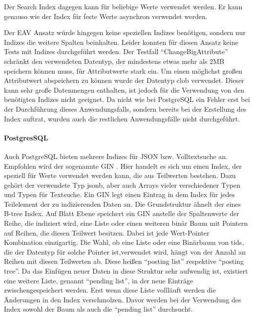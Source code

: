 Der Search Index dagegen kann für beliebige Werte verwendet werden. Er kann genauso wie der Index für feste Werte asynchron verwendet werden. \cite{OracleHelpCenter.2019}

Der EAV Ansatz würde hingegen keine speziellen Indizes benötigen, sondern nur Indizes die weitere Spalten beinhalten. Leider konnten für diesen Ansatz keine Tests mit Indizes durchgeführt werden. Der Testfall ``ChangeBigAttribute'' schränkt den verwendeten Datentyp, der mindestens etwas mehr als 2MB speichern können muss, für Attributwerte stark ein. Um einen möglichst großen Attributwert abspeichern zu können wurde der Datentyp clob verwendet. Dieser kann sehr große Datenmengen enthalten, ist jedoch für die Verwendung von den benötigten Indizes nicht geeignet. Da nicht wie bei PostgreSQL ein Fehler erst bei der Durchführung dieses Anwendungsfalls, sondern bereits bei der Erstellung des Index auftrat, wurden auch die restlichen Anwendungsfälle nicht durchgeführt.



\paragraph{PostgresSQL}

Auch PostgreSQL bieten mehrere Indizes für \ac{JSON} bzw. Volltextsuche an. Empfohlen wird der sogenannte \acf{GIN} \cite{PostgreSQLDocumentation.2021}. Hier handelt es sich um einen Index, der speziell für Werte verwendet werden kann, die aus Teilwerten bestehen. Dazu gehört der verwendete Typ jsonb, aber auch Arrays vieler verschiedener Typen und Typen für Textsuche. Ein \ac{GIN} legt einen Eintrag in dem Index für jedes Teilelement der zu indizierenden Daten an. Die Grundstruktur ähnelt der eines B-tree Index. Auf Blatt Ebene speichert ein \ac{GIN} anstelle der Spaltenwerte der Reihe, die indiziert wird, eine Liste oder einen weiteren binär Baum mit Pointern auf Reihen, die diesen Teilwert besitzen. Dabei ist jede Wert-Pointer Kombination einzigartig. Die Wahl, ob eine Liste oder eine Binärbaum von tids, die der Datentyp für solche Pointer ist,verwendet wird, hängt von der Anzahl an Reihen mit diesen Teilwerten ab. Diese heißen ``posting list'' respektive ``posting tree''. Da das Einfügen neuer Daten in diese Struktur sehr aufwendig ist, existiert eine weitere Liste, genannt ``pending list'', in der neue Einträge zwischengespeichert werden. Erst wenn diese Liste vollläuft werden die Änderungen in den Index verschmolzen. Davor werden bei der Verwendung des Index sowohl der Baum als auch die ``pending list'' durchsucht. \cite{Grandjonc.24.10.2020}


